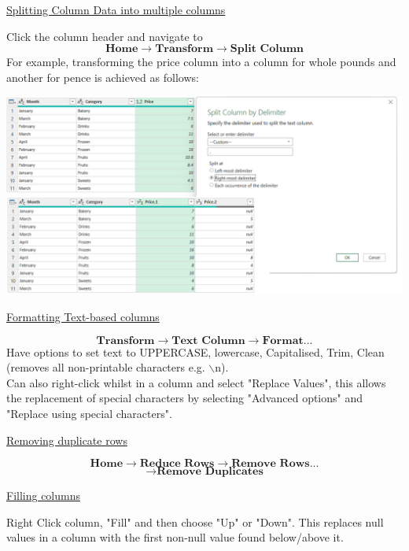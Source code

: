 \documentclass[8pt]{extarticle}
\begin{document}
\begin{multicols}{3}
\begin{center}
    \underline{Splitting Column Data into multiple columns}
\end{center}

Click the column header and navigate to 
\[\textbf{Home} \rightarrow \textbf{Transform} \rightarrow \textbf{Split Column}\]
For example, transforming the price column into a column for whole pounds and another for pence is achieved as follows:
\begin{center}
    \includegraphics[width=\columnwidth]{images/split_column.png}
\end{center}

\begin{center}
    \underline{Formatting Text-based columns}
\end{center}
\[\textbf{Transform} \rightarrow \textbf{Text Column} \rightarrow \textbf{Format...}\]
Have options to set text to UPPERCASE, lowercase, Capitalised, Trim, Clean (removes all non-printable characters e.g. $\backslash$n).\\

Can also right-click whilst in a column and select "Replace Values", this allows the replacement of special characters by selecting "Advanced options" and "Replace using special characters".

\begin{center}
    \underline{Removing duplicate rows}
\end{center}
\[\textbf{Home} \rightarrow \textbf{Reduce Rows} \rightarrow \textbf{Remove Rows...}\]\[ \rightarrow \textbf{Remove Duplicates}\]

\begin{center}
    \underline{Filling columns}
\end{center}
Right Click column, "Fill" and then choose "Up" or "Down". This replaces null values in a column with the first non-null value found below/above it.


\end{multicols}
\end{document}

